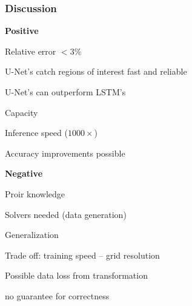 \begin{frame}
    \frametitle{Discussion}
	\vspace*{0.8cm}
	
	\begin{multicols}{2}
    \textbf{Positive}

\begin{PraesentationAufzaehlung}

	\item Relative error $< 3\%$
	
	\item U-Net's catch regions of interest fast and reliable

    \item U-Net's can outperform LSTM’s
    
    \item Capacity

    \item Inference speed ($1000\times$)
    
    \item Accuracy improvements possible
\end{PraesentationAufzaehlung}

	\vfill\columnbreak
    \textbf{Negative}

\begin{PraesentationAufzaehlung}
\item Proir knowledge

\item Solvers needed (data generation)

\item Generalization 


\item Trade off: training speed -- grid resolution

\item Possible data loss from transformation

\item no guarantee for correctness

\end{PraesentationAufzaehlung}
\end{multicols}

\end{frame}
\clearpage